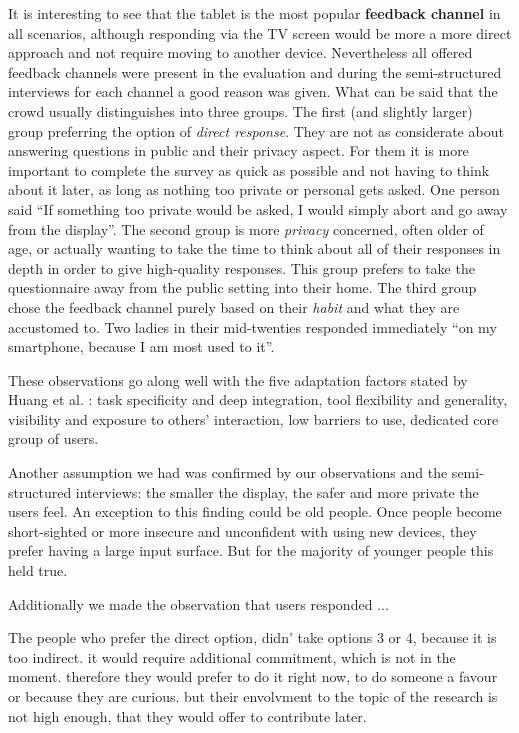 	
	It is interesting to see that the tablet is the most popular \textbf{feedback channel} in all scenarios, although responding via the TV screen would be more a more direct approach and not require moving to another device. 
	Nevertheless all offered feedback channels were present in the evaluation and during the semi-structured interviews for each channel a good reason was given. What can be said that the crowd usually distinguishes into three groups. The first (and slightly larger) group preferring the option of \textit{direct response}. They are not as considerate about answering questions in public and their privacy aspect. For them it is more important to complete the survey as quick as possible and not having to think about it later, as long as nothing too private or personal gets asked. One person said ``If something too private would be asked, I would simply abort and go away from the display''. The second group is more \textit{privacy} concerned, often older of age, or actually wanting to take the time to think about all of their responses in depth in order to give high-quality responses. This group prefers to take the questionnaire away from the public setting into their home. The third group chose the feedback channel purely based on their \textit{habit} and what they are accustomed to. Two ladies in their mid-twenties responded immediately ``on my smartphone, because I am most used to it''.

	These observations go along well with the five adaptation factors stated by Huang et al. \cite{Huang2004}: task specificity and deep integration, tool flexibility and generality, visibility and exposure to others' interaction, low barriers to use, dedicated core group of users.

	Another assumption we had was confirmed by our observations and the semi-structured interviews: the smaller the display, the safer and more private the users feel. An exception to this finding could be old people. Once people become short-sighted or more insecure and unconfident with using new devices, they prefer having a large input surface. But for the majority of younger people this held true.

	Additionally we made the observation that users responded ...



	The people who prefer the direct option, didn' take options 3 or 4, because it is too indirect. it would require additional commitment, which is not in the moment. therefore they would prefer to do it right now, to do someone a favour or because they are curious. but their envolvment to the topic of the research is not high enough, that they would offer to contribute later.
	




